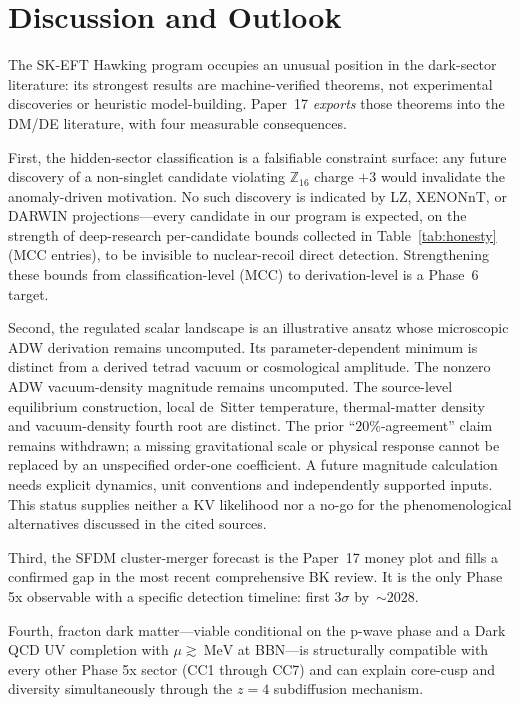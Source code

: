\documentclass[aps,prd,twocolumn,showpacs,superscriptaddress,nofootinbib]{revtex4-2}
\begin{document}
\section{Discussion and Outlook}
\label{sec:discussion}

The SK-EFT Hawking program occupies an unusual position in the
dark-sector literature: its strongest results are machine-verified
theorems, not experimental discoveries or heuristic model-building.
Paper~17 \emph{exports} those theorems into the DM/DE literature,
with four measurable consequences.

First, the hidden-sector classification is a falsifiable constraint
surface: any future discovery of a non-singlet candidate violating
$\mathbb{Z}_{16}$ charge $+3$ would invalidate the anomaly-driven
motivation. No such discovery is indicated by LZ, XENONnT, or
DARWIN projections---every candidate in our program is
expected, on the strength of deep-research per-candidate bounds
collected in Table~\ref{tab:honesty} (MCC entries), to be invisible to
nuclear-recoil direct detection. Strengthening these bounds from
classification-level (MCC) to derivation-level is a Phase~6 target.

Second, the regulated scalar landscape is an illustrative ansatz whose
microscopic ADW derivation remains uncomputed. Its parameter-dependent
minimum is distinct from a derived tetrad vacuum or cosmological amplitude.
The nonzero ADW vacuum-density magnitude remains uncomputed.
The source-level equilibrium construction, local de~Sitter temperature,
thermal-matter density and vacuum-density fourth root are distinct.
The prior ``$20\%$-agreement'' claim remains withdrawn; a missing
gravitational scale or physical response cannot be replaced by an
unspecified order-one coefficient. A future magnitude calculation needs
explicit dynamics, unit conventions and independently supported inputs.
This status supplies neither a KV likelihood nor a no-go for the
phenomenological alternatives discussed in the cited sources.

Third, the SFDM cluster-merger forecast is the Paper~17 money plot and
fills a confirmed gap in the most recent comprehensive BK review.
It is the only Phase 5x observable with a specific detection
timeline: first $3\sigma$ by~${\sim}2028$.

Fourth, fracton dark matter---viable conditional on the p-wave phase
and a Dark QCD UV completion with $\mu \gtrsim \SI{}{\mega\electronvolt}$
at BBN---is structurally compatible with every other Phase 5x sector
(CC1 through CC7) and can explain core-cusp and diversity
simultaneously through the $z{=}4$ subdiffusion mechanism.
\end{document}
